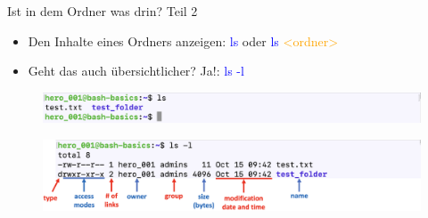 \documentclass[t, xcolor=dvipsnames]{beamer}
\begin{document}
\begin{frame}{Ist in dem Ordner was drin? Teil 2}
    \begin{itemize}
        \item Den Inhalte eines Ordners anzeigen: \textcolor{blue}{ls} oder \textcolor{blue}{ls} \textcolor{orange}{<ordner>}
        \item Geht das auch übersichtlicher? Ja!: \textcolor{blue}{ls -l}
    \end{itemize}
    
    \begin{figure}
        \centering
        \includegraphics[width=1\textwidth]{graphics/ls}
    \end{figure}
    
    \begin{figure}
        \centering
        \includegraphics[width=1\textwidth]{graphics/ls -l explained}
    \end{figure}
\end{frame}
\end{document}

